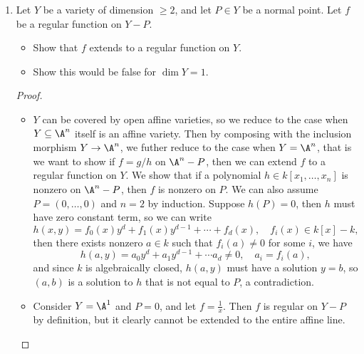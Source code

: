 \documentclass[a4paper]{article}
\begin{document}
\begin{enumerate} [label=\textbf{\arabic*.}, leftmargin=-0.05em]
\item[\textbf{20.}] Let $Y$ be a variety of dimension $\geq 2$, and let $P \in Y$ be a normal point. Let $f$ be a regular function on $Y - P$.
\begin{itemize}
    \item[(a)] Show that $f$ extends to a regular function on $Y$.
    \item[(b)] Show this would be false for $\dim{Y} = 1$.
\end{itemize}

\begin{proof} $ $ \vspace{0pt}
    \begin{itemize} [leftmargin=0cm]
        \item[(a)] $Y$ can be covered by open affine varieties, so we reduce to the case when $Y \subseteq \A^n$ itself is an affine variety.
        Then by composing with the inclusion morphism $Y \to \A^n$, we futher reduce to the case when $Y = \A^n$, that is we want to show if $f = g / h$ on $\A^n - P$, then we can extend $f$ to a regular function on $Y$.
        We show that if a polynomial $h \in k[x_1, \dots, x_n]$ is nonzero on $\A^n - P$, then $f$ is nonzero on $P$.
        We can also assume $P = (0, \dots, 0)$ and $n = 2$ by induction.
        Suppose $h(P) = 0$, then $h$ must have zero constant term, so we can write
        \begin{equation*}
            h(x, y) = f_0(x) y^d + f_1(x) y^{d - 1} + \cdots + f_d(x), \quad f_i(x) \in k[x] - k,
        \end{equation*}
        then there exists nonzero $a \in k$ such that $f_i(a) \neq 0$ for some $i$, we have
        \begin{equation*}
            h(a, y) = a_0 y^d + a_1 y^{d - 1} + \cdots a_d \neq 0, \quad a_i = f_i(a),
        \end{equation*}
        and since $k$ is algebraically closed, $h(a, y)$ must have a solution $y = b$, so $(a, b)$ is a solution to $h$ that is not equal to $P$, a contradiction.

        \item[(b)] Consider $Y = \A^1$ and $P = 0$, and let $f = \frac{1}{x}$. Then $f$ is regular on $Y - P$ by definition, but it clearly cannot be extended to the entire affine line.
    \end{itemize}
\end{proof}

\end{enumerate}
\end{document}
